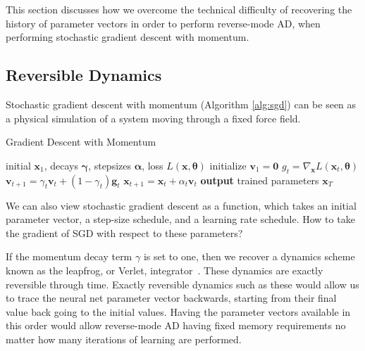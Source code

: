 \documentclass{article}
\newcommand{\vx}{\mathbf{x}}
\newcommand{\vv}{\mathbf{v}}
\newcommand{\vg}{\mathbf{g}}
\newcommand{\vzero}{\mathbf{0}}
\newcommand{\hypers}{{\boldsymbol{\theta}}}
\newcommand{\params}{\vx}
\newcommand{\decay}{\gamma}
\newcommand{\decays}{{\boldsymbol{\decay}}}
\newcommand{\stepsize}{\alpha}
\newcommand{\stepsizes}{{\boldsymbol{\stepsize}}}
\newcommand{\gradparamst}{\nabla_\params L(\params_t, \hypers)}
\begin{document}
This section discusses how we overcome the technical difficulty of recovering the history of parameter vectors in order to perform reverse-mode AD, when performing stochastic gradient descent with momentum.

\subsection{Reversible Dynamics}

Stochastic gradient descent with momentum (Algorithm \ref{alg:sgd}) can be seen as a physical simulation of a system moving through a fixed force field.
%
\begin{algorithm}
   \caption{Gradient Descent with Momentum}
   \label{alg:sgd}
\begin{algorithmic}[1]
    initial $\vx_1$, decays $\decays$, stepsizes $\stepsizes$, loss $L(\params, \hypers)$
   \State initialize $\vv_1 = \vzero$
   \State $g_t = \gradparamst$ 
   \State $\vv_{t+1} = \decay_t \vv_t + (1 - \decay_t) \vg_t$ 
   \State $\vx_{t+1} = \vx_t + \stepsize_t \vv_t$ 
   \EndFor
   \State \textbf{output} trained parameters $\vx_T$
\end{algorithmic}
\end{algorithm}
%
We can also view stochastic gradient descent as a function, which takes an initial parameter vector, a step-size schedule, and a learning rate schedule.
How to take the gradient of SGD with respect to these parameters?

If the momentum decay term $\gamma$ is set to one, then we recover a dynamics scheme known as the leapfrog, or Verlet, integrator~\citep{leapfrog1995}.
These dynamics are exactly reversible through time.
Exactly reversible dynamics such as these would allow us to trace the neural net parameter vector backwards, starting from their final value back going to the initial values.
Having the parameter vectors available in this order would allow reverse-mode AD having fixed memory requirements no matter how many iterations of learning are performed.
\end{document}
